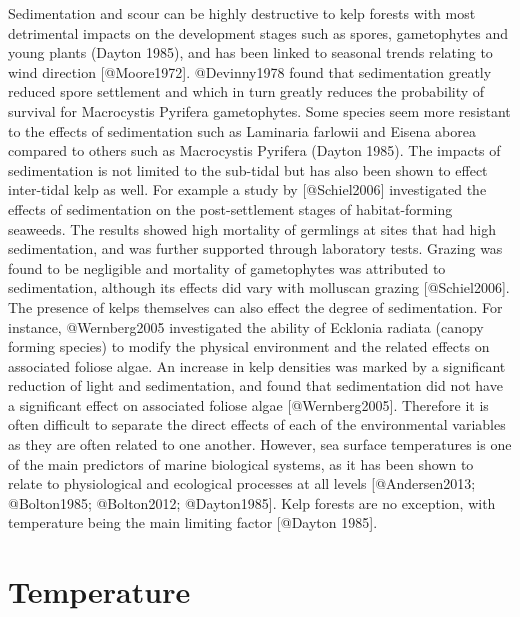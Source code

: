 \documentclass[]{article}
\begin{document}
Sedimentation and scour can be highly destructive to kelp forests with
most detrimental impacts on the development stages such as spores,
gametophytes and young plants (Dayton 1985), and has been linked to
seasonal trends relating to wind direction {[}@Moore1972{]}.
@Devinny1978 found that sedimentation greatly reduced spore settlement
and which in turn greatly reduces the probability of survival for
Macrocystis Pyrifera gametophytes. Some species seem more resistant to
the eﬀects of sedimentation such as Laminaria farlowii and Eisena aborea
compared to others such as Macrocystis Pyrifera (Dayton 1985). The
impacts of sedimentation is not limited to the sub-tidal but has also
been shown to eﬀect inter-tidal kelp as well. For example a study by
{[}@Schiel2006{]} investigated the eﬀects of sedimentation on the
post-settlement stages of habitat-forming seaweeds. The results showed
high mortality of germlings at sites that had high sedimentation, and
was further supported through laboratory tests. Grazing was found to be
negligible and mortality of gametophytes was attributed to
sedimentation, although its eﬀects did vary with molluscan grazing
{[}@Schiel2006{]}. The presence of kelps themselves can also eﬀect the
degree of sedimentation. For instance, @Wernberg2005 investigated the
ability of Ecklonia radiata (canopy forming species) to modify the
physical environment and the related eﬀects on associated foliose algae.
An increase in kelp densities was marked by a signiﬁcant reduction of
light and sedimentation, and found that sedimentation did not have a
signiﬁcant eﬀect on associated foliose algae {[}@Wernberg2005{]}.
Therefore it is often diﬃcult to separate the direct eﬀects of each of
the environmental variables as they are often related to one another.
However, sea surface temperatures is one of the main predictors of
marine biological systems, as it has been shown to relate to
physiological and ecological processes at all levels {[}@Andersen2013;
@Bolton1985; @Bolton2012; @Dayton1985{]}. Kelp forests are no exception,
with temperature being the main limiting factor {[}@Dayton 1985{]}.

\section{Temperature}\label{temperature}
\end{document}
